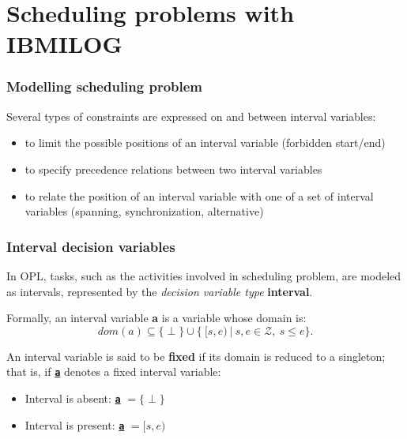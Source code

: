 \section{Scheduling problems with IBM\cmark ILOG}

\begin{frame} \frametitle{Modelling scheduling problem}
\pause
Several types of constraints are expressed on and between interval variables:\pause

\begin{itemize}[<+->]
\item to limit the possible positions of an interval variable (forbidden start/end)
\item to specify precedence relations between two interval variables
\item to relate the position of an interval variable with one of a set of interval variables (spanning, synchronization, alternative)

\end{itemize}

\end{frame}


\begin{frame} \frametitle{Interval decision variables}
\pause
In OPL, tasks, such as the activities involved in scheduling problem, are modeled as intervals, represented by the \emph{decision variable type} \textbf{interval}.

\pause\medskip

Formally, an interval variable \textbf{a} is a variable whose domain is:\pause
\begin{equation*}
dom(a) \subseteq \{\perp\} \cup \{~[s,e)~|~s,e\in \mathcal{Z},~s\leq e\}.
\end{equation*} 

\pause\medskip

An interval variable is said to be \textbf{fixed} if its domain is reduced to a singleton; that is, if \textbf{\texttt{\underline{a}}} denotes a fixed interval variable:\pause
\begin{itemize}[<+->]
\item Interval is absent:  \textbf{\texttt{\underline{a}}} $ = \{\perp\}$
\item Interval is present: \textbf{\texttt{\underline{a}}} $ = [s,e)$

\end{itemize}

\end{frame}


